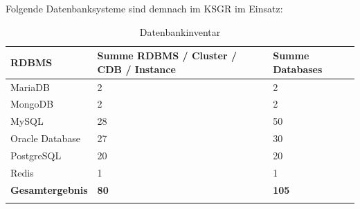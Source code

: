 Folgende Datenbanksysteme sind demnach im KSGR im Einsatz:
\begin{longtable}{@{}lll@{}}
\toprule
\textbf{\Gls{RDBMS}}                   & \textbf{Summe RDBMS / Cluster / CDB / Instance} & \textbf{Summe Databases} \\* \midrule
\endfirsthead
%
\endhead
%
\bottomrule
\endfoot
%
\endlastfoot
%
\Gls{MariaDB}                 & 2                                      & 2               \\
\Gls{MongoDB}                 & 2                                      & 2               \\
\Gls{MySQL}                   & 28                                     & 50              \\
\Gls{Oracle Database}         & 27                                     & 30              \\
\Gls{PostgreSQL}              & 20                                     & 20              \\
\Gls{Redis}                   & 1                                      & 1               \\* \midrule
\textbf{Gesamtergebnis} & \textbf{80}                            & \textbf{105}    \\* \bottomrule
\caption{Datenbankinventar}
\label{Datenbankinventar}
\end{longtable}

